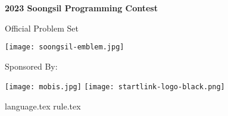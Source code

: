 \documentclass [11pt, a4paper, oneside] {article}
\begin{document}
    \vspace*{15mm}
    \begin{center}
        \Huge
        \textbf{2023 Soongsil Programming Contest}

        \vspace{25mm}
        Official Problem Set
        
        \vspace{20mm}
        \texttt{[image: soongsil-emblem.jpg]}
        
        \vspace{45mm}
        Sponsored By:
    
	\texttt{[image: mobis.jpg]}
        \texttt{[image: startlink-logo-black.png]}
     
    \end{center}
    
    \pagebreak

    {language.tex} \pagebreak
    {rule.tex} \pagebreak
\end{document}
